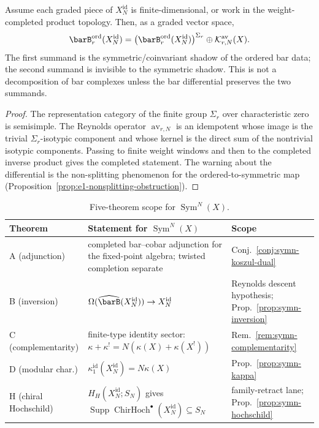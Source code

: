 \begin{proposition}\label{prop:symn-averaging-kernel}
Assume each graded piece of $X_N^{\mathrm{id}}$ is finite-dimensional,
or work in the weight-completed product topology. Then, as a graded
vector space,
\[
 \barB^{\mathrm{ord}}_r(X_N^{\mathrm{id}})
 =
 \bigl(\barB^{\mathrm{ord}}_r(X_N^{\mathrm{id}})\bigr)^{\Sigma_r}
 \oplus \mathcal K^{\mathrm{av}}_{r,N}(X).
\]
The first summand is the symmetric/coinvariant shadow of the ordered
bar data; the second summand is invisible to the symmetric shadow.
This is not a decomposition of bar complexes unless the bar
differential preserves the two summands.
\end{proposition}

\begin{proof}
The representation category of the finite group $\Sigma_r$ over
characteristic zero is semisimple. The Reynolds operator
$\operatorname{av}_{r,N}$ is an idempotent whose image is the trivial
$\Sigma_r$-isotypic component and whose kernel is the direct sum of
the nontrivial isotypic components. Passing to finite weight windows
and then to the completed inverse product gives the completed
statement. The warning about the differential is the
non-splitting phenomenon for the ordered-to-symmetric map
\textup{(}Proposition~\textup{\ref{prop:e1-nonsplitting-obstruction}}\textup{)}.
\end{proof}

\begin{table}[ht]
\centering
\small
\caption{Five-theorem scope for
$\operatorname{Sym}^N(X)$.}\label{tab:symn-five-theorems}
\begin{tabular}{p{2.5cm}p{6.6cm}p{4.2cm}}
\toprule
\textbf{Theorem} & \textbf{Statement for $\operatorname{Sym}^N(X)$}
 & \textbf{Scope} \\
\midrule
A (adjunction) &
 completed bar--cobar adjunction for the fixed-point algebra;
 twisted completion separate
 & Conj.~\ref{conj:symn-koszul-dual} \\
B (inversion) &
 $\Omega(\widehat{\barB}(X_N^{\mathrm{id}}))\to X_N^{\mathrm{id}}$
 & Reynolds descent hypothesis; Prop.~\ref{prop:symn-inversion} \\
C (complementarity) &
 finite-type identity sector:
 $\kappa+\kappa^!=N(\kappa(X)+\kappa(X^!))$
 & Rem.~\ref{rem:symn-complementarity} \\
D (modular char.) &
 $\kappa^{\mathrm{id}}_1(X_N^{\mathrm{id}})=N\kappa(X)$
 & Prop.~\ref{prop:symn-kappa} \\
H (chiral Hochschild) &
 $H_H(X_N^{\mathrm{id}};S_N)$ gives
 $\operatorname{Supp}\operatorname{ChirHoch}^\bullet
 (X_N^{\mathrm{id}})\subseteq S_N$
 & family-retract lane; Prop.~\ref{prop:symn-hochschild} \\
\bottomrule
\end{tabular}
\end{table}

